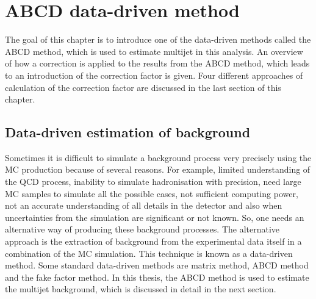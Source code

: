 


\chapter{ABCD data-driven method}
\label{sec:abcd}
The goal of this chapter is to introduce one of the data-driven methods called the ABCD method, which is used to estimate multijet in this analysis. An overview of how a correction is applied to the results from the ABCD method, which leads to an introduction of the correction factor is given. Four different approaches of calculation of the correction factor are discussed in the last section of this chapter.

\section{Data-driven estimation of background}
\label{sec:abcd:data-driven}
Sometimes it is difficult to simulate a background process very precisely using the MC production because of several reasons. For example, limited understanding of the QCD process, inability to simulate hadronisation with precision, need large MC samples to simulate all the possible cases, not sufficient computing power, not an accurate understanding of all details in the detector and also when uncertainties from the simulation are significant or not known. So, one needs an alternative way of producing these background processes. The alternative approach is the extraction of background from the experimental data itself in a combination of the MC simulation. This technique is known as a data-driven method. Some standard data-driven methods are matrix method, ABCD method and the fake factor method. In this thesis, the ABCD method is used to estimate the multijet background, which is discussed in detail in the next section.

